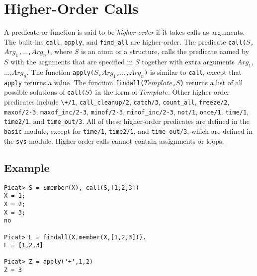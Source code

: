 \section{Higher-Order Calls}
A predicate or function is said to be \emph{higher-order} if it takes calls as arguments. The built-ins \texttt{call}, \texttt{apply}, and \texttt{find\_all} are higher-order. The predicate \texttt{call($S$,$Arg_1$,$\ldots$,$Arg_n$)}, where $S$ is an atom or a structure, calls the predicate named by $S$ with the arguments that are specified in $S$ together with extra arguments $Arg_1$,$\ldots$,$Arg_n$. The function \texttt{apply($S$,$Arg_1$,$\ldots$,$Arg_n$)} is similar to \texttt{call}, except that \texttt{apply} returns a value. The function \texttt{findall($Template$,$S$)} returns a list of all possible solutions of \texttt{call($S$)} in the form of $Template$. Other higher-order predicates include \verb-\+/1-, \texttt{call\_cleanup/2}, \texttt{catch/3}, \texttt{count\_all}, \texttt{freeze/2}, \texttt{maxof/2-3}, \texttt{maxof\_inc/2-3}, \texttt{minof/2-3}, \texttt{minof\_inc/2-3}, \texttt{not/1}, \texttt{once/1},  \texttt{time/1}, \texttt{time2/1}, and \texttt{time\_out/3}. All of these higher-order predicates are defined in the {\tt basic} module, except for \texttt{time/1}, \texttt{time2/1}, and \texttt{time\_out/3}, which are defined in the {\tt sys} module. Higher-order calls cannot contain assignments or loops.

\subsection*{Example}
\begin{verbatim}
Picat> S = $member(X), call(S,[1,2,3])
X = 1;
X = 2;
X = 3;
no

Picat> L = findall(X,member(X,[1,2,3])).
L = [1,2,3]

Picat> Z = apply('+',1,2)
Z = 3
\end{verbatim}

